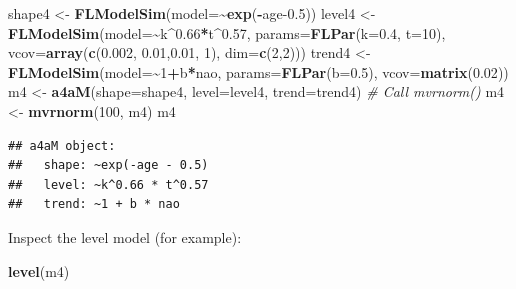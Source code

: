 \documentclass[
]{book}
\newenvironment{Shaded}{\begin{snugshade}}{\end{snugshade}}
\newcommand{\AttributeTok}[1]{\textcolor[rgb]{0.13,0.29,0.53}{#1}}
\newcommand{\CommentTok}[1]{\textcolor[rgb]{0.56,0.35,0.01}{\textit{#1}}}
\newcommand{\DecValTok}[1]{\textcolor[rgb]{0.00,0.00,0.81}{#1}}
\newcommand{\FloatTok}[1]{\textcolor[rgb]{0.00,0.00,0.81}{#1}}
\newcommand{\FunctionTok}[1]{\textcolor[rgb]{0.13,0.29,0.53}{\textbf{#1}}}
\newcommand{\NormalTok}[1]{#1}
\newcommand{\OtherTok}[1]{\textcolor[rgb]{0.56,0.35,0.01}{#1}}
\newcommand{\SpecialCharTok}[1]{\textcolor[rgb]{0.81,0.36,0.00}{\textbf{#1}}}
\begin{document}
\begin{Shaded}
\begin{Highlighting}[]
\NormalTok{shape4 }\OtherTok{\textless{}{-}} \FunctionTok{FLModelSim}\NormalTok{(}\AttributeTok{model=}\SpecialCharTok{\textasciitilde{}}\FunctionTok{exp}\NormalTok{(}\SpecialCharTok{{-}}\NormalTok{age}\FloatTok{{-}0.5}\NormalTok{))}
\NormalTok{level4 }\OtherTok{\textless{}{-}} \FunctionTok{FLModelSim}\NormalTok{(}\AttributeTok{model=}\SpecialCharTok{\textasciitilde{}}\NormalTok{k}\SpecialCharTok{\^{}}\FloatTok{0.66}\SpecialCharTok{*}\NormalTok{t}\SpecialCharTok{\^{}}\FloatTok{0.57}\NormalTok{,}
    \AttributeTok{params=}\FunctionTok{FLPar}\NormalTok{(}\AttributeTok{k=}\FloatTok{0.4}\NormalTok{, }\AttributeTok{t=}\DecValTok{10}\NormalTok{),}
    \AttributeTok{vcov=}\FunctionTok{array}\NormalTok{(}\FunctionTok{c}\NormalTok{(}\FloatTok{0.002}\NormalTok{, }\FloatTok{0.01}\NormalTok{,}\FloatTok{0.01}\NormalTok{, }\DecValTok{1}\NormalTok{), }\AttributeTok{dim=}\FunctionTok{c}\NormalTok{(}\DecValTok{2}\NormalTok{,}\DecValTok{2}\NormalTok{)))}
\NormalTok{trend4 }\OtherTok{\textless{}{-}} \FunctionTok{FLModelSim}\NormalTok{(}\AttributeTok{model=}\SpecialCharTok{\textasciitilde{}}\DecValTok{1}\SpecialCharTok{+}\NormalTok{b}\SpecialCharTok{*}\NormalTok{nao,}
    \AttributeTok{params=}\FunctionTok{FLPar}\NormalTok{(}\AttributeTok{b=}\FloatTok{0.5}\NormalTok{),}
    \AttributeTok{vcov=}\FunctionTok{matrix}\NormalTok{(}\FloatTok{0.02}\NormalTok{))}
\NormalTok{m4 }\OtherTok{\textless{}{-}} \FunctionTok{a4aM}\NormalTok{(}\AttributeTok{shape=}\NormalTok{shape4, }\AttributeTok{level=}\NormalTok{level4, }\AttributeTok{trend=}\NormalTok{trend4)}
\CommentTok{\# Call mvrnorm()}
\NormalTok{m4 }\OtherTok{\textless{}{-}} \FunctionTok{mvrnorm}\NormalTok{(}\DecValTok{100}\NormalTok{, m4)}
\NormalTok{m4}
\end{Highlighting}
\end{Shaded}

\begin{verbatim}
## a4aM object:
##   shape: ~exp(-age - 0.5)
##   level: ~k^0.66 * t^0.57
##   trend: ~1 + b * nao
\end{verbatim}

Inspect the level model (for example):

\begin{Shaded}
\begin{Highlighting}[]
\FunctionTok{level}\NormalTok{(m4)}
\end{Highlighting}
\end{Shaded}
\end{document}

